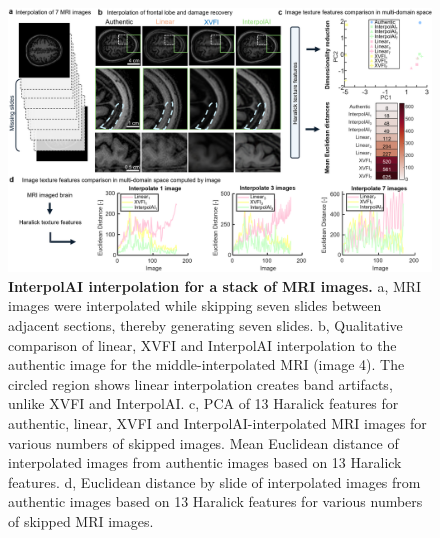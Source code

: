 \begin{refsection}
    \begin{figure}[!htb] 
      \centering
      \includegraphics[width=\linewidth,                   height=0.85\textheight,                   keepaspectratio]{figures/chapter6/fig_5.png}
      \captionsetup{font=small}
      \caption{\textbf{InterpolAI interpolation for a stack of MRI images.} a, MRI images were
        interpolated while skipping seven slides between adjacent sections, thereby
        generating seven slides. b, Qualitative comparison of linear, XVFI and InterpolAI
        interpolation to the authentic image for the middle-interpolated MRI (image 4).
        The circled region shows linear interpolation creates band artifacts, unlike XVFI
        and InterpolAI. c, PCA of 13 Haralick features for authentic, linear, XVFI and
        InterpolAI-interpolated MRI images for various numbers of skipped images.
        Mean Euclidean distance of interpolated images from authentic images based on
        13 Haralick features. d, Euclidean distance by slide of interpolated images from
        authentic images based on 13 Haralick features for various numbers of skipped
        MRI images.}
      \label{chapter6_fig5}
    \end{figure}
    
    

\end{refsection}
